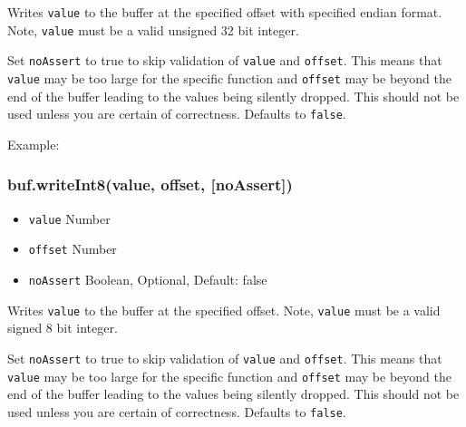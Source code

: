 Writes \texttt{value} to the buffer at the specified offset with
specified endian format. Note, \texttt{value} must be a valid unsigned
32 bit integer.

Set \texttt{noAssert} to true to skip validation of \texttt{value} and
\texttt{offset}. This means that \texttt{value} may be too large for the
specific function and \texttt{offset} may be beyond the end of the
buffer leading to the values being silently dropped. This should not be
used unless you are certain of correctness. Defaults to \texttt{false}.

Example:

\begin{Shaded}
\begin{Highlighting}[]
  \NormalTok{);}
\NormalTok{(}\NormalTok{, }\NormalTok{);}


\NormalTok{(}\NormalTok{, }\NormalTok{);}


\end{Highlighting}
\end{Shaded}

\subsubsection{buf.writeInt8(value, offset, {[}noAssert{]})}

\begin{itemize}
\item
  \texttt{value} Number
\item
  \texttt{offset} Number
\item
  \texttt{noAssert} Boolean, Optional, Default: false
\end{itemize}

Writes \texttt{value} to the buffer at the specified offset. Note,
\texttt{value} must be a valid signed 8 bit integer.

Set \texttt{noAssert} to true to skip validation of \texttt{value} and
\texttt{offset}. This means that \texttt{value} may be too large for the
specific function and \texttt{offset} may be beyond the end of the
buffer leading to the values being silently dropped. This should not be
used unless you are certain of correctness. Defaults to \texttt{false}.

